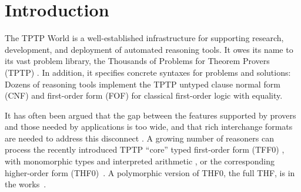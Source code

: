\section{Introduction}
\label{sec_intro}

%
%
%
%
%
%
%
%
%
%

The TPTP World \cite{sutcliffe-2010-world} is a well-established infrastructure
for supporting research, development, and deployment of automated reasoning
tools. It owes its name to its vast problem library, the Thousands of Problems for Theorem
Provers (TPTP) \cite{sutcliffe-2009-lib}. In addition, it specifies concrete
syntaxes for problems and solutions:
Dozens of reasoning tools implement the TPTP untyped clause normal form
(CNF) and first-order form (FOF) for classical
first-order logic with equality.

It has often been argued that the gap between the features supported by provers
and those needed by applications is too wide, and that rich interchange formats
are needed to address this disconnect \cite{voronkov-2003,kuncak-2011}.
A growing number of reasoners can process the
recently introduced TPTP ``core'' typed first-order form (TFF0) \cite{sutcliffe-et-al-2012-tff0},
with monomorphic types and interpreted arithmetic \cite{SPASS-T,vampire-arith},
or the corresponding higher-order form (THF0)~\cite{benzmueller-et-al-2008-thf0}.
A polymorphic version of THF0, the full THF, is in the works~\cite{sutcliffe-benzmueller-2010}.


